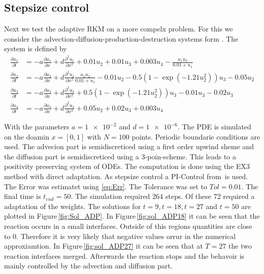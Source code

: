 \documentclass[a4paper]{scrartcl}
\numberwithin{equation}{section}
\theoremstyle{plain}
\theoremstyle{definition}
\numberwithin{theorem}{section}
\newcommand{\1}{\mathbbm{1}}
\begin{document}
\subsection{Stepsize control}

Next we test the adaptive RKM on a more compelx problem. 
For this we consider the advection-diffusion-production-destruction systems form \citep{kopecz_comparison_2019}. The system is defined by
\begin{subequations}
\label{eq:ADR}
\begin{align}
\frac{\partial u_1}{\partial t} &=-a \frac{\partial u_1}{\partial x} + d\frac{\partial^2 u_1}{\partial x ^2} + 0.01u_2 + 0.01 u_3 +0.003u_4 - \frac{u_1 u_2}{0.01+u_1} \\ 
\frac{\partial u_2}{\partial t} &=-a \frac{\partial u_2}{\partial x} + d\frac{\partial^2 u_2}{\partial x ^2}\frac{u_1u_2}{0.01+u_1} -0.01 u_2-0.5(1-\exp(-1.21 u_2^2)) u_3 -0.05 u_2 \\ 
\frac{\partial u_3}{\partial t} &=-a \frac{\partial u_3}{\partial x} + d\frac{\partial^2 u_3}{\partial x ^2} + 0.5(1-\exp(-1.21u_2^2)) u_3 - 0.01 u_3 -0.02 u_3 \\ 
\frac{\partial u_4}{\partial t} &=-a \frac{\partial u_4}{\partial x} + d\frac{\partial^2 u_4}{\partial x ^2} + 0.05 u_2 + 0.02 u_3 + 0.003u_4 
\end{align}
\end{subequations}

With the parameters $    a=\num{1e-2} $ and $ d=\num{1e-6}$.
The PDE is simulated on the doamin $x = [0,1]$ with $N=100$ points. Periodic boundarie conditions are used.
The advecion part is semidiscreticed using a first order upwind sheme and the diffusion part is semidiscreticed using a 3-poin-scheme. This leads to a positivity preserving system of ODEs. 
The computation is done using the EX3 method with direct adaptation.
As stepsize control a PI-Control from\,\cite{hairer_solving_1996} is used. The Error was estimatet using \eqref{eq:Err}. The Tolerance was set to $Tol = 0.01$. 
The final time is $t_{end} = 50$.
The simulation required 264 steps. Of these 72 required a adaptation of the weights.
The solutions for $t=9,t=18,t=27$ and $t=50$ are plotted in Figure\,\ref{fig:Sol_ADP}.
In Figure\,\ref{fig:sol_ADP18} it can be seen that the reaction occurs in a small interfaces.
Outside of this regions quantities are close to $0$. Therefore it is very likely that negative values orrur in the numerical approxiamtion.
In Figure\,\ref{fig:sol_ADP27} it can be seen that at $T=27$ the two reaction interfaces merged. Afterwards the reaction stops and the behavoir is mainly controlled by the advection and diffusion part.
\end{document}
